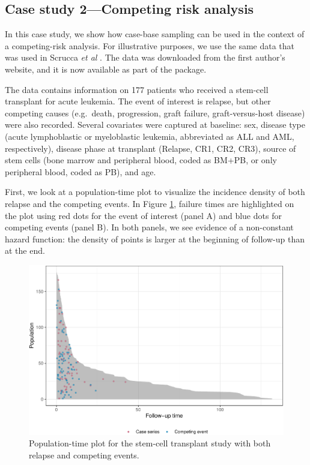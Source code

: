 \hypertarget{case-study-2competing-risk-analysis}{%
\subsection{Case study 2---Competing risk
analysis}\label{case-study-2competing-risk-analysis}}

In this case study, we show how case-base sampling can be used in the
context of a competing-risk analysis. For illustrative purposes, we use
the same data that was used in Scrucca \emph{et al}
\citeyearpar{scrucca2010regression}. The data was downloaded from the
first author's website, and it is now available as part of the
 package.

The data contains information on 177 patients who received a stem-cell
transplant for acute leukemia. The event of interest is relapse, but
other competing causes (e.g.~death, progression, graft failure,
graft-versus-host disease) were also recorded. Several covariates were
captured at baseline: sex, disease type (acute lymphoblastic or
myeloblastic leukemia, abbreviated as ALL and AML, respectively),
disease phase at transplant (Relapse, CR1, CR2, CR3), source of stem
cells (bone marrow and peripheral blood, coded as BM+PB, or only
peripheral blood, coded as PB), and age.

First, we look at a population-time plot to visualize the incidence
density of both relapse and the competing events. In Figure
\ref{fig:compPop}, failure times are highlighted on the plot using red
dots for the event of interest (panel A) and blue dots for competing
events (panel B). In both panels, we see evidence of a non-constant
hazard function: the density of points is larger at the beginning of
follow-up than at the end.

\begin{Schunk}
\begin{figure}[ht]
\includegraphics[width=\textwidth,keepaspectratio=true]{./compPop-1} \caption[Population-time plot for the stem-cell transplant study with both relapse and competing events]{Population-time plot for the stem-cell transplant study with both relapse and competing events.}\label{fig:compPop}
\end{figure}
\end{Schunk}


